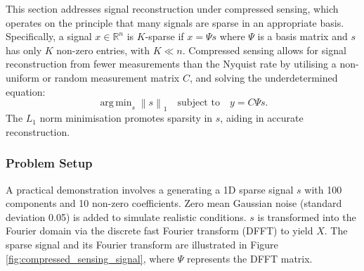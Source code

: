 \documentclass[11pt]{article}
\DeclareMathOperator*{\argmin}{arg\,min}  %
\begin{document}
This section addresses signal reconstruction under compressed sensing, which operates on the principle that many signals are sparse in an appropriate basis. Specifically, a signal \( x \in \mathbb{R}^n \) is \( K \)-sparse if \( x = \Psi s \) where \( \Psi \) is a basis matrix and \( s \) has only \( K \) non-zero entries, with \( K \ll n \). Compressed sensing allows for signal reconstruction from fewer measurements than the Nyquist rate by utilising a non-uniform or random measurement matrix \( C \), and solving the underdetermined equation:
\[
\argmin_{s} \left\| s \right\|_1 \quad \text{subject to} \quad y = C \Psi s.
\]
The \( L_1 \) norm minimisation promotes sparsity in \( s \), aiding in accurate reconstruction.


\subsubsection{Problem Setup}
A practical demonstration involves a generating a 1D sparse signal \( s \) with 100 components and 10 non-zero coefficients. Zero mean Gaussian noise (standard deviation 0.05) is added to simulate realistic conditions. $s$ is transformed into the Fourier domain via the discrete fast Fourier transform (DFFT) to yield \( X \).  The sparse signal and its Fourier transform are illustrated in Figure \ref{fig:compressed_sensing_signal}, where \( \Psi \) represents the DFFT matrix.
\end{document}

